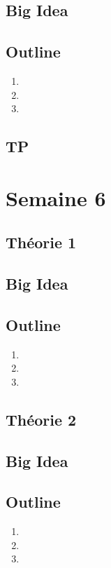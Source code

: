 \documentclass{article}
\begin{document}
\subsection*{Big Idea}
\subsection*{Outline}
    \begin{enumerate}
    \item
    \item
    \item
    \end{enumerate}
\subsection{TP}

\pagebreak
\section{Semaine 6}
\subsection{Théorie 1}
\subsection*{Big Idea}
\subsection*{Outline}
    \begin{enumerate}
    \item
    \item
    \item
    \end{enumerate}
\subsection{Théorie 2}
\subsection*{Big Idea}
\subsection*{Outline}
    \begin{enumerate}
    \item
    \item
    \item
    \end{enumerate}
\end{document}
